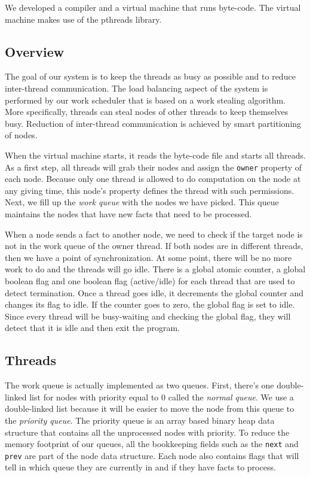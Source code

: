 
We developed a compiler and a virtual machine that runs
byte-code. The virtual machine makes use of the pthreads library.

\subsection{Overview}

The goal of our system is to keep the threads as busy as possible and to reduce inter-thread communication.
The load balancing aspect of the system is performed by our work scheduler that is based on a work
stealing algorithm. More specifically, threads can steal nodes of other threads to keep themselves busy.
Reduction of inter-thread communication is achieved by smart partitioning of nodes.

When the virtual machine starts, it reads the byte-code file and starts all threads.
As a first step, all threads will grab their nodes and assign the \texttt{owner} property of each node.
Because only one thread is allowed to do computation on the node at any giving time, this node's property
defines the thread with such permissions.
Next, we fill up the \emph{work queue} with the nodes we have picked. This queue
maintains the nodes that have new facts that need to be processed.

When a node sends a fact to another node, we need to check if the target node is not in the work queue of the owner thread.
If both nodes are in different threads, then we have a point of synchronization. At some point,
there will be no more work to do and the threads will go idle. There is a global atomic counter, a global
boolean flag and one boolean flag (active/idle) for each thread that are used to detect termination.
Once a thread goes idle, it decrements the global counter and changes its flag to idle. If the counter
goes to zero, the global flag is set to idle. Since every thread will be busy-waiting and checking
the global flag, they will detect that it is idle and then exit the program.

\subsection{Threads}

The work queue is actually implemented as two queues. First, there's one double-linked list for nodes
with priority equal to 0 called the \emph{normal queue}.
We use a double-linked list because it will be easier to move the node from this queue to the
\emph{priority queue}. The priority queue is an array based binary heap data structure that contains
all the unprocessed nodes with priority. To reduce the memory footprint of our queues, all the bookkeeping fields
such as the \texttt{next} and \texttt{prev} are part of the node data structure.
Each node also contains flags that will tell in which queue they are currently in and if they have facts to process.

